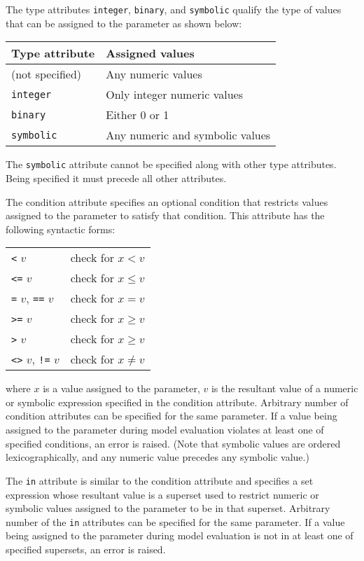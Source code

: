 \documentclass[10pt]{article}
\begin{document}
The type attributes {\tt integer}, {\tt binary}, and {\tt symbolic}
qualify the type of values that can be assigned to the parameter as
shown below:

\medskip

\noindent\hfil
\begin{tabular}{@{}ll@{}}
Type attribute&Assigned values\\
\hline
(not specified)&Any numeric values\\
{\tt integer}&Only integer numeric values\\
{\tt binary}&Either 0 or 1\\
{\tt symbolic}&Any numeric and symbolic values\\
\end{tabular}

\newpage

The {\tt symbolic} attribute cannot be specified along with other type
attributes. Being specified it must precede all other attributes.

The condition attribute specifies an optional condition that restricts
values assigned to the parameter to satisfy that condition. This
attribute has the following syntactic forms:

\medskip

\begin{tabular}{@{}ll@{}}
{\tt<} $v$&check for $x<v$\\
{\tt<=} $v$&check for $x\leq v$\\
{\tt=} $v$, {\tt==} $v$&check for $x=v$\\
{\tt>=} $v$&check for $x\geq v$\\
{\tt>} $v$&check for $x\geq v$\\
{\tt<>} $v$, {\tt!=} $v$&check for $x\neq v$\\
\end{tabular}

\medskip

\noindent where $x$ is a value assigned to the parameter, $v$ is the
resultant value of a numeric or symbolic expression specified in the
condition attribute. Arbitrary number of condition attributes can be
specified for the same parameter. If a value being assigned to the
parameter during model evaluation violates at least one of specified
conditions, an error is raised. (Note that symbolic values are ordered
lexicographically, and any numeric value precedes any symbolic value.)

The {\tt in} attribute is similar to the condition attribute and
specifies a set expression whose resultant value is a superset used to
restrict numeric or symbolic values assigned to the parameter to be in
that superset. Arbitrary number of the {\tt in} attributes can be
specified for the same parameter. If a value being assigned to the
parameter during model evaluation is not in at least one of specified
supersets, an error is raised.
\end{document}
